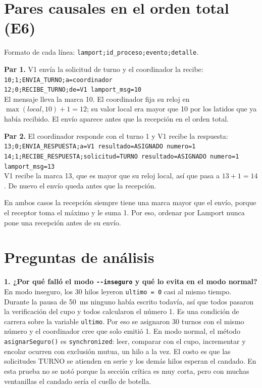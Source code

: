 \documentclass[11pt,a4paper]{article}
\begin{document}
\section{Pares causales en el orden total (E6)}
\label{sec:e6}

Formato de cada línea: \texttt{lamport;id\_proceso;evento;detalle}.

\textbf{Par 1.} V1 envía la solicitud de turno y el coordinador la recibe:\\
\texttt{10;1;ENVIA\_TURNO;a=coordinador}\\
\texttt{12;0;RECIBE\_TURNO;de=V1 lamport\_msg=10}\\
El mensaje lleva la marca 10. El coordinador fija su reloj en $\max(\mathit{local}, 10)+1 = 12$; su valor local era mayor que 10 por los latidos que ya había recibido. El envío aparece antes que la recepción en el orden total.

\textbf{Par 2.} El coordinador responde con el turno 1 y V1 recibe la respuesta:\\
\texttt{13;0;ENVIA\_RESPUESTA;a=V1 resultado=ASIGNADO numero=1}\\
\texttt{14;1;RECIBE\_RESPUESTA;solicitud=TURNO resultado=ASIGNADO numero=1 lamport\_msg=13}\\
V1 recibe la marca 13, que es mayor que su reloj local, así que pasa a $13+1 = 14$. De nuevo el envío queda antes que la recepción.

En ambos casos la recepción siempre tiene una marca mayor que el envío, porque el receptor toma el máximo y le suma 1. Por eso, ordenar por Lamport nunca pone una recepción antes de su envío.

\section{Preguntas de análisis}

\textbf{1. ¿Por qué falló el modo \texttt{-{}-inseguro} y qué lo evita en el modo normal?}
En modo inseguro, los 30 hilos leyeron \texttt{ultimo = 0} casi al mismo tiempo. Durante la pausa de 50~ms ninguno había escrito todavía, así que todos pasaron la verificación del cupo y todos calcularon el número 1. Es una condición de carrera sobre la variable \texttt{ultimo}. Por eso se asignaron 30 turnos con el mismo número y el coordinador cree que solo emitió 1. En modo normal, el método \texttt{asignarSeguro()} es \texttt{synchronized}: leer, comparar con el cupo, incrementar y encolar ocurren con exclusión mutua, un hilo a la vez. El costo es que las solicitudes TURNO se atienden en serie y los demás hilos esperan el candado. En esta prueba no se notó porque la sección crítica es muy corta, pero con muchas ventanillas el candado sería el cuello de botella.
\end{document}
